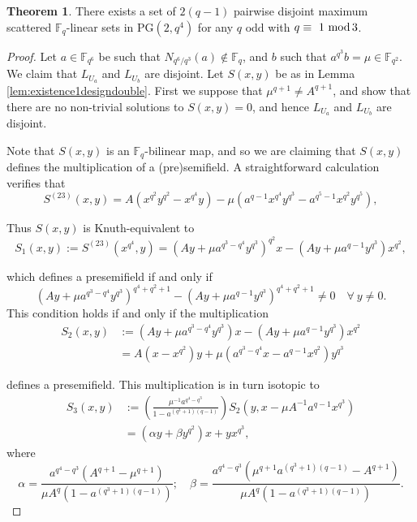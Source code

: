 \documentclass[11pt]{amsart}
\theoremstyle{definition}
\newtheorem{theorem}{Theorem}[section]
\newcommand{\F}{{\mathbb F}}
\newcommand{\fq}{{\mathbb F}_{q}}
\renewcommand{\mod}{\hbox{{\rm mod}\,}}
\newcommand{\PG}{\mathrm{PG}}
\begin{document}
\begin{theorem} %
There exists a set of $2(q-1)$ pairwise disjoint maximum scattered $\F_q$-linear sets in $\PG(2,q^4)$ for any $q$ odd with $q\equiv ~1~ \mod 3$.
\end{theorem}

\begin{proof}
Let $a\in \F_{q^6}$ be such that $N_{q^6/q^3}(a)\notin \F_q$, and $b$ such that $a^{q^3}b=\mu\in \F_{q^2}$. We claim that $L_{U_a}$ and $L_{U_b}$ are disjoint. Let $S(x,y)$ be as in Lemma \ref{lem:existence1designdouble}. First we suppose that $\mu^{q+1}\ne A^{q+1}$, and show that there are no non-trivial solutions to $S(x,y)=0$, and hence $L_{U_a}$ and $L_{U_b}$ are disjoint.
    
    Note that $S(x,y)$ is an $\fq$-bilinear map, and so we are claiming that $S(x,y)$ defines the multiplication of a (pre)semifield. 
A straightforward calculation verifies that 
    \[
    S^{(23)}(x,y)=   A(x^{q^2}y^{q^2}-x^{q^4}y)-\mu(a^{q-1}x^{q^4}y^{q^3}-a^{q^5-1}x^{q^2}y^{q^5}),
    \] 
    
    Thus $S(x,y)$  is Knuth-equivalent to 
    \[
    S_1(x,y):= S^{(23)}(x^{q^4},y) = (Ay+\mu a^{q^3-q^4}y^{q^3})^{q^2}x-(Ay+\mu a^{q-1}y^{q^3})x^{q^2},
    \] 
    
    which defines a presemifield if and only if 
\[
    (Ay+\mu a^{q^3-q^4}y^{q^3})^{q^4+q^2+1}-(Ay+\mu a^{q-1}y^{q^3})^{q^4+q^2+1}\ne 0\quad\forall~y\ne 0.
    \]
    This condition holds if and only if the multiplication
        \begin{align*}
           S_2(x,y)&:= (Ay+\mu a^{q^3-q^4}y^{q^3})x-(Ay+\mu a^{q-1}y^{q^3})x^{q^2} \\
           &= A(x-x^{q^2})y+\mu(a^{q^3-q^4}x-a^{q-1}x^{q^2})y^{q^3}
        \end{align*}
    
    
defines a presemifield. %
This multiplication is in turn isotopic to 
\begin{align*}
S_3(x,y)&:=\left(\frac{\mu^{-1}a^{q^4-q^3}}{1-a^{(q^3+1)(q-1)}}\right)S_2(y,x-\mu A^{-1}a^{q-1}x^{q^3})\\&= (\alpha y+\beta y^{q^2})x+yx^{q^3},
\end{align*}
where 
\[
\alpha = \frac{a^{q^4-q^3}(A^{q+1}-\mu^{q+1})}{\mu A^{q}(1-a^{(q^3+1)(q-1)})}
 ;\quad \beta = \frac{ a^{q^4-q^3}(\mu^{q+1}a^{(q^3+1)(q-1)}-A^{q+1})}{\mu A^{q}(1-a^{(q^3+1)(q-1)})}.
\]


\end{proof}
\end{document}
